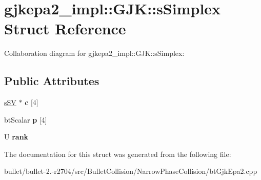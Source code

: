 \hypertarget{structgjkepa2__impl_1_1_g_j_k_1_1s_simplex}{\section{gjkepa2\+\_\+impl\+:\+:G\+J\+K\+:\+:s\+Simplex Struct Reference}
\label{structgjkepa2__impl_1_1_g_j_k_1_1s_simplex}
}


Collaboration diagram for gjkepa2\+\_\+impl\+:\+:G\+J\+K\+:\+:s\+Simplex\+:
\subsection*{Public Attributes}
\begin{DoxyCompactItemize}
\item 
\hypertarget{structgjkepa2__impl_1_1_g_j_k_1_1s_simplex_a1fb2add7d2c837c16e2369b6c1ca8ff9}{\hyperlink{structgjkepa2__impl_1_1_g_j_k_1_1s_s_v}{s\+S\+V} $\ast$ {\bfseries c} \mbox{[}4\mbox{]}}\label{structgjkepa2__impl_1_1_g_j_k_1_1s_simplex_a1fb2add7d2c837c16e2369b6c1ca8ff9}

\item 
\hypertarget{structgjkepa2__impl_1_1_g_j_k_1_1s_simplex_a213f4cdd828ba68282330f2390accfc7}{bt\+Scalar {\bfseries p} \mbox{[}4\mbox{]}}\label{structgjkepa2__impl_1_1_g_j_k_1_1s_simplex_a213f4cdd828ba68282330f2390accfc7}

\item 
\hypertarget{structgjkepa2__impl_1_1_g_j_k_1_1s_simplex_a97bc5764f27917fef42a979f21c1c040}{U {\bfseries rank}}\label{structgjkepa2__impl_1_1_g_j_k_1_1s_simplex_a97bc5764f27917fef42a979f21c1c040}

\end{DoxyCompactItemize}


The documentation for this struct was generated from the following file\+:\begin{DoxyCompactItemize}
\item 
bullet/bullet-\/2.-\/r2704/src/\+Bullet\+Collision/\+Narrow\+Phase\+Collision/bt\+Gjk\+Epa2.\+cpp\end{DoxyCompactItemize}
